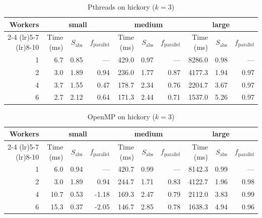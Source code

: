 \documentclass[conference]{IEEEtran}
\begin{document}
\begin{table}[t]
\caption{Pthreads on hickory ($k=3$)}
\label{tab:hickory-threaded}
\centering
\begin{tabular}{rrrrrrrrrr}
\toprule
Workers & \multicolumn{3}{c}{small} & \multicolumn{3}{c}{medium} & \multicolumn{3}{c}{large} \\
\cmidrule(lr){2-4} \cmidrule(lr){5-7} \cmidrule(lr){8-10}
 & Time (ms) & $S_{\text{abs}}$ & $f_{\text{parallel}}$ & Time (ms) & $S_{\text{abs}}$ & $f_{\text{parallel}}$ & Time (ms) & $S_{\text{abs}}$ & $f_{\text{parallel}}$ \\
\midrule
1 & 6.7 & 0.85 & --- & 429.0 & 0.97 & --- & 8286.0 & 0.98 & --- \\
2 & 3.0 & 1.89 & 0.94 & 236.0 & 1.77 & 0.87 & 4177.3 & 1.94 & 0.97 \\
4 & 3.7 & 1.55 & 0.47 & 178.7 & 2.34 & 0.76 & 2204.7 & 3.67 & 0.97 \\
6 & 2.7 & 2.12 & 0.64 & 171.3 & 2.44 & 0.71 & 1537.0 & 5.26 & 0.97 \\
\bottomrule
\end{tabular}
\end{table}

\begin{table}[t]
\caption{OpenMP on hickory ($k=3$)}
\label{tab:hickory-openmp}
\centering
\begin{tabular}{rrrrrrrrrr}
\toprule
Workers & \multicolumn{3}{c}{small} & \multicolumn{3}{c}{medium} & \multicolumn{3}{c}{large} \\
\cmidrule(lr){2-4} \cmidrule(lr){5-7} \cmidrule(lr){8-10}
 & Time (ms) & $S_{\text{abs}}$ & $f_{\text{parallel}}$ & Time (ms) & $S_{\text{abs}}$ & $f_{\text{parallel}}$ & Time (ms) & $S_{\text{abs}}$ & $f_{\text{parallel}}$ \\
\midrule
1 & 6.0 & 0.94 & --- & 420.7 & 0.99 & --- & 8142.3 & 0.99 & --- \\
2 & 3.0 & 1.89 & 0.94 & 244.7 & 1.71 & 0.83 & 4122.7 & 1.96 & 0.98 \\
4 & 10.7 & 0.53 & -1.18 & 169.3 & 2.47 & 0.79 & 2112.0 & 3.83 & 0.99 \\
6 & 15.3 & 0.37 & -2.05 & 146.7 & 2.85 & 0.78 & 1638.3 & 4.94 & 0.96 \\
\bottomrule
\end{tabular}
\end{table}
\end{document}
